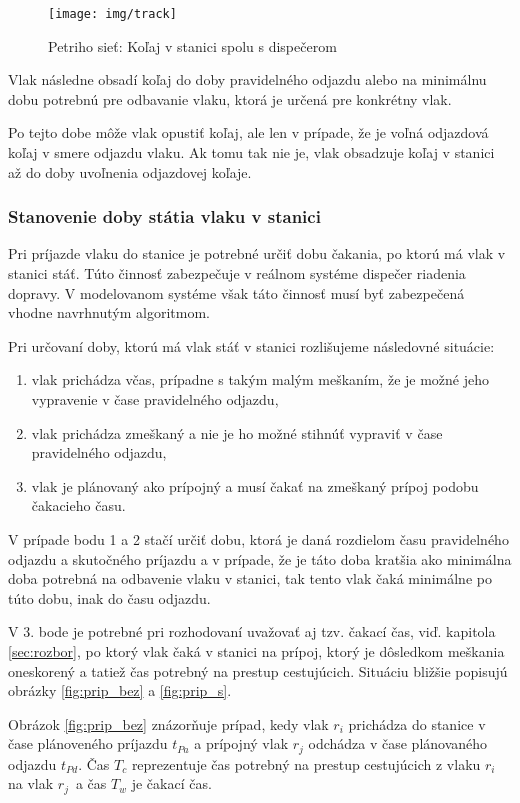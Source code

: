 \documentclass[12pt,a4paper,titlepage,final]{article}
\begin{document}
\begin{figure}[!h]
	\centering
	\texttt{[image: img/track]}
	\caption{Petriho sieť: Koľaj v stanici spolu s dispečerom} \label{fig:track}
\end{figure}

Vlak následne obsadí koľaj do doby pravidelného odjazdu alebo na minimálnu dobu potrebnú pre odbavanie vlaku, ktorá je určená pre konkrétny vlak.

Po tejto dobe môže vlak opustiť koľaj, ale len v prípade, že je voľná odjazdová koľaj v smere odjazdu vlaku.
Ak tomu tak nie je, vlak obsadzuje koľaj v stanici až do doby uvoľnenia odjazdovej koľaje.

\subsubsection*{Stanovenie doby státia vlaku v stanici} \label{sec:statie}

Pri príjazde vlaku do stanice je potrebné určiť dobu čakania, po ktorú má vlak v stanici stáť. Túto činnosť zabezpečuje v reálnom systéme dispečer riadenia dopravy. V modelovanom systéme však táto činnosť musí byť zabezpečená vhodne navrhnutým algoritmom.

Pri určovaní doby, ktorú má vlak stáť v stanici rozlišujeme následovné situácie:
\begin{enumerate}
	\item vlak prichádza včas, prípadne s takým malým meškaním, že je možné jeho vypravenie v čase pravidelného odjazdu,
	\item vlak prichádza zmeškaný a nie je ho možné stihnúť vypraviť v čase pravidelného odjazdu,
	\item vlak je plánovaný ako prípojný a musí čakať na zmeškaný prípoj podobu čakacieho času.
\end{enumerate}

V prípade bodu 1 a 2 stačí určiť dobu, ktorá je daná rozdielom
času pravidelného odjazdu a skutočného príjazdu a v prípade, že je táto doba kratšia
ako minimálna doba potrebná na odbavenie vlaku v stanici, tak tento vlak čaká minimálne po túto dobu, inak do času odjazdu.

V 3. bode je potrebné pri rozhodovaní uvažovať aj tzv. čakací čas, viď. kapitola \ref{sec:rozbor},
po ktorý vlak čaká v stanici na prípoj, ktorý je dôsledkom meškania oneskorený a tatiež čas potrebný na prestup cestujúcich. Situáciu bližšie popisujú obrázky \ref{fig:prip_bez} a \ref{fig:prip_s}.

Obrázok \ref{fig:prip_bez} znázorňuje prípad, kedy vlak $r_i$ prichádza do stanice v čase plánoveného príjazdu $t_{Pa}$ a prípojný vlak $r_j$ odchádza v čase plánovaného odjazdu $t_{Pd}$. Čas $T_c$ reprezentuje čas potrebný na prestup cestujúcich z vlaku $r_i$ na vlak $r_j$ a čas $T_w$ je čakací čas.
\end{document}
